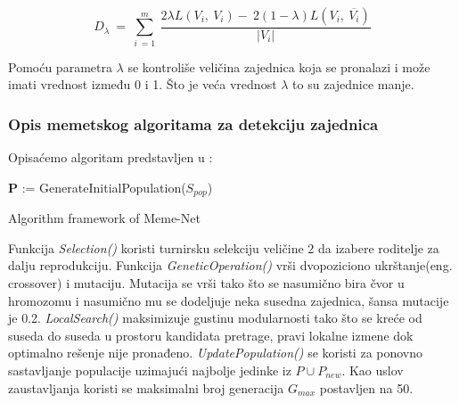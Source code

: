 \documentclass[a4paper]{article}
\begin{document}
\begin{equation}
D_\lambda\:=\:\sum _{i\:=1}^m\:\frac{2\lambda L\left(V_i,\:V_i\right)-\:2\left(1-\lambda\right)L\left(V_i,\:\overline{V_i}\right)}{\left|V_i\right|}
\end{equation}

Pomoću parametra $\lambda$ se kontroliše veličina zajednica koja se pronalazi i može imati vrednost između 0 i 1. Što je veća vrednost $\lambda$ to su zajednice manje.

\subsubsection{Opis memetskog algoritama za detekciju zajednica}

Opisaćemo algoritam predstavljen u \cite{gong}:

\begin{minipage}{0.9\linewidth}%
\begin{algorithm}[H]
\SetAlgoLined
{}
\textbf{P} := GenerateInitialPopulation($S_{pop}$)
\;
 \caption{Algorithm framework of Meme-Net}
\end{algorithm}
\end{minipage}


\verb||



Funkcija \textit{Selection()} koristi turnirsku selekciju veličine 2 da izabere roditelje za dalju reprodukciju. Funkcija \textit{GeneticOperation()} vrši dvopoziciono ukrštanje(eng.  crossover) i mutaciju. Mutacija se vrši tako što se nasumično bira čvor u hromozomu i nasumično mu se dodeljuje neka susedna zajednica, šansa mutacije je 0.2. \textit{LocalSearch()} maksimizuje gustinu modularnosti tako što se kreće od suseda do suseda u prostoru kandidata pretrage, pravi lokalne izmene dok optimalno rešenje nije pronađeno. \textit{UpdatePopulation()} se koristi za ponovno sastavljanje populacije uzimajući najbolje jedinke iz $P \cup P_{new}$. Kao uslov zaustavljanja koristi se maksimalni broj generacija $G_{max}$ postavljen na 50.
\end{document}
